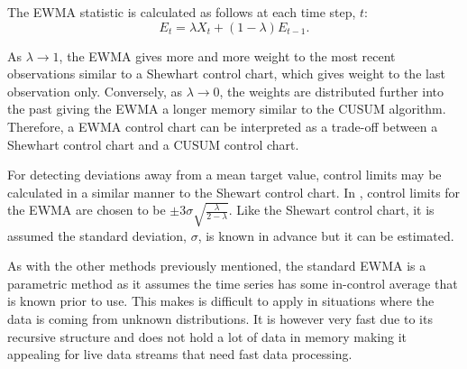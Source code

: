 The EWMA statistic is calculated as follows at each time step, $t$:
$$E_t = \lambda X_t + (1-\lambda)E_{t-1}. $$

As $\lambda \to 1$, the EWMA gives more and more weight to the most recent observations similar to a Shewhart control chart, which gives weight to the last observation only. Conversely, as $\lambda \to 0$, the weights are distributed further into the past giving the EWMA a longer memory similar to the CUSUM algorithm. Therefore, a EWMA control chart can be interpreted as a trade-off between a Shewhart control chart and a CUSUM control chart. 

For detecting deviations away from a mean target value, control limits may be calculated in a similar manner to the Shewart control chart. In \cite{hunter1986exponentially}, control limits for the EWMA are chosen to be  $\pm 3 \sigma \sqrt{\frac{\lambda}{2-\lambda}}$.  Like the Shewart control chart, it is assumed the standard deviation, $\sigma$, is known in advance but it can be estimated. %


As with the other methods previously mentioned, the standard EWMA is a parametric method as it assumes the time series has some in-control average that is known prior to use. This makes is difficult to apply in situations where the data is coming from unknown distributions. It is however very fast due to its recursive structure and does not hold a lot of data in memory making it appealing for live data streams that need fast data processing.